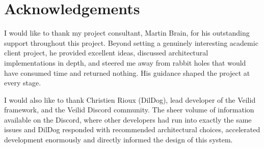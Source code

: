 \documentclass[11pt]{article}
\numberwithin{equation}{section}
\newcommand*{\BeginNoToc}{%
  \addtocontents{toc}{%
    \edef\protect\SavedTocDepth{\protect\the\protect\value{tocdepth}}%
  }%
  \addtocontents{toc}{%
    \protect\setcounter{tocdepth}{-10}%
  }%
}
\newcommand*{\EndNoToc}{%
  \addtocontents{toc}{%
    \protect\setcounter{tocdepth}{\protect\SavedTocDepth}%
  }%
}
\begin{document}


\newpage

\newpage
\section*{Acknowledgements}
I would like to thank my project consultant, Martin Brain, for his
outstanding support throughout this project.  Beyond setting a genuinely
interesting academic client project, he provided excellent ideas, discussed
architectural implementations in depth, and steered me away from rabbit
holes that would have consumed time and returned nothing.  His guidance
shaped the project at every stage.

I would also like to thank Christien Rioux (DilDog), lead developer of the
Veilid framework, and the Veilid Discord community.  The sheer volume of information available on the Discord, where other
developers had run into exactly the same issues and DilDog responded with
recommended architectural choices, accelerated development enormously and
directly informed the design of this system.
\newpage
{}
\BeginNoToc
\listoffigures
\listoftables

\EndNoToc
\newpage
\tableofcontents

\newpage
{}


\begin{otherlanguage}{australian}
\printbibliography
\end{otherlanguage}


\let\svaddcontentsline\addcontentsline
\renewcommand\addcontentsline[3]{%
  \ifthenelse{\equal{#1}{lof}}{}%
  {\ifthenelse{\equal{#1}{lot}}{}{\svaddcontentsline{#1}{#2}{#3}}}}

\appendixtitleon
\appendixtitletocon
\appendix
\makeatletter
\def\@seccntformat#1{\csname Pref@#1\endcsname \csname the#1\endcsname\quad}
\def\Pref@section{Appendix~}
\makeatother %





\end{document}
